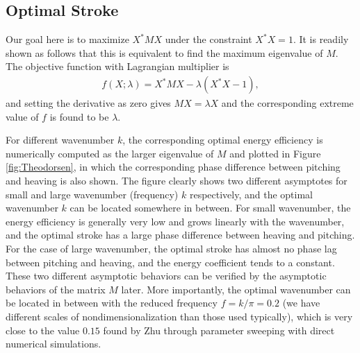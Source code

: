 \subsection{Optimal Stroke}

Our goal here is to maximize $X^* M X$ under the constraint $X^* X = 1$.
It is readily shown as follows that this is equivalent to find the maximum eigenvalue of $M$.
The objective function with Lagrangian multiplier is 
\begin{align}
f(X; \lambda) = X^* M X - \lambda (X^* X - 1),
\end{align}
and setting the derivative as zero gives $MX = \lambda X$ and the corresponding extreme value of $f$ is found to be $\lambda$.

For different wavenumber $k$, the corresponding optimal energy efficiency is numerically computed as the larger eigenvalue of $M$ and plotted in Figure \ref{fig:Theodorsen}, in which the corresponding phase difference between pitching and heaving is also shown.
The figure clearly shows two different asymptotes for small and large wavenumber (frequency) $k$ respectively, and the optimal wavenumber $k$ can be located somewhere in between.
For small wavenumber, the energy efficiency is generally very low and grows linearly with the wavenumber, and the optimal stroke has a large phase difference between heaving and pitching.
For the case of large wavenumber, the optimal stroke has almost no phase lag between pitching and heaving, and the energy coefficient tends to a constant.
These two different asymptotic behaviors can be verified by the asymptotic behaviors of the matrix $M$ later.
More importantly, the optimal wavenumber can be located in between with the reduced frequency $f = k/\pi = 0.2$ (we have different scales of nondimensionalization than those used typically), which is very close to the value $0.15$ found by Zhu through parameter sweeping with direct numerical simulations.

